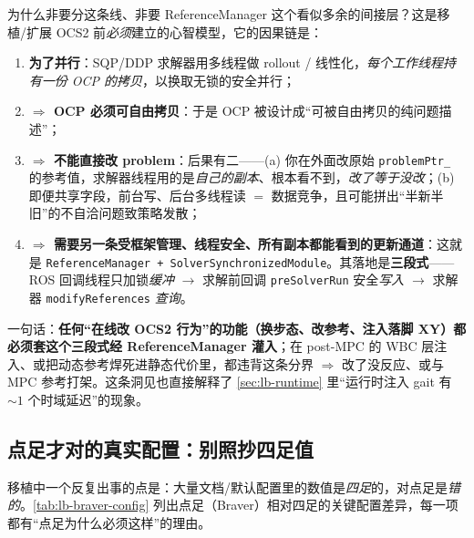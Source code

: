 \begin{insight}\label{ins:lb-refmgr-why}
为什么非要分这条线、非要 ReferenceManager 这个看似多余的间接层？这是移植/扩展 OCS2 前\emph{必须}建立的心智模型，它的因果链是：
\begin{enumerate}
  \item \textbf{为了并行}：SQP/DDP 求解器用多线程做 rollout / 线性化，\emph{每个工作线程持有一份 OCP 的拷贝}，以换取无锁的安全并行；
  \item \textbf{$\Rightarrow$ OCP 必须可自由拷贝}：于是 OCP 被设计成“可被自由拷贝的纯问题描述”；
  \item \textbf{$\Rightarrow$ 不能直接改 problem}：后果有二——(a) 你在外面改原始 \texttt{problemPtr\_} 的参考值，求解器线程用的是\emph{自己的副本}、根本看不到，\emph{改了等于没改}；(b) 即便共享字段，前台写、后台多线程读 $=$ 数据竞争，且可能拼出“半新半旧”的不自洽问题致策略发散；
  \item \textbf{$\Rightarrow$ 需要另一条受框架管理、线程安全、所有副本都能看到的更新通道}：这就是 \texttt{ReferenceManager + SolverSynchronizedModule}。其落地是\textbf{三段式}——ROS 回调线程只加锁\emph{缓冲} $\to$ 求解前回调 \texttt{preSolverRun} 安全\emph{写入} $\to$ 求解器 \texttt{modifyReferences} \emph{查询}。
\end{enumerate}
一句话：\textbf{任何“在线改 OCS2 行为”的功能（换步态、改参考、注入落脚 XY）都必须套这个三段式经 ReferenceManager 灌入}；在 post-MPC 的 WBC 层注入、或把动态参考焊死进静态代价里，都违背这条分界 $\Rightarrow$ 改了没反应、或与 MPC 参考打架。这条洞见也直接解释了 \cref{sec:lb-runtime} 里“运行时注入 gait 有 $\sim 1$ 个时域延迟”的现象。
\end{insight}

\subsection{点足才对的真实配置：别照抄四足值}
\label{subsec:lb-config}

移植中一个反复出事的点是：大量文档/默认配置里的数值是\emph{四足}的，对点足是\emph{错的}。\cref{tab:lb-braver-config} 列出点足（Braver）相对四足的关键配置差异，每一项都有“点足为什么必须这样”的理由。

